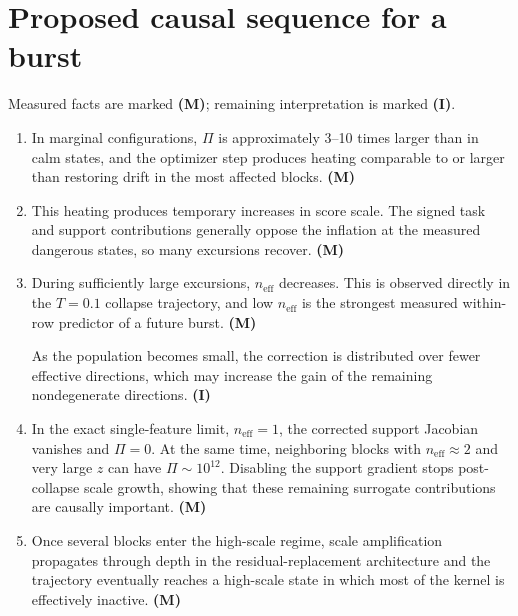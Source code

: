 \documentclass[11pt,a4paper]{article}
\newcommand{\neff}{n_{\mathrm{eff}}}
\newcommand{\Pisurr}{\Pi}
\begin{document}
\section{Proposed causal sequence for a burst}

Measured facts are marked \textbf{(M)}; remaining interpretation is marked \textbf{(I)}.

\begin{enumerate}[leftmargin=1.6em]
\item In marginal configurations, \(\Pisurr\) is approximately 3--10 times larger than in calm states, and the optimizer step produces heating comparable to or larger than restoring drift in the most affected blocks. \textbf{(M)}

\item This heating produces temporary increases in score scale. The signed task and support contributions generally oppose the inflation at the measured dangerous states, so many excursions recover. \textbf{(M)}

\item During sufficiently large excursions, \(\neff\) decreases. This is observed directly in the \(T=0.1\) collapse trajectory, and low \(\neff\) is the strongest measured within-row predictor of a future burst. \textbf{(M)}

As the population becomes small, the correction is distributed over fewer effective directions, which may increase the gain of the remaining nondegenerate directions. \textbf{(I)}

\item In the exact single-feature limit, \(\neff=1\), the corrected support Jacobian vanishes and \(\Pisurr=0\). At the same time, neighboring blocks with \(\neff\approx2\) and very large \(z\) can have \(\Pisurr\sim10^{12}\). Disabling the support gradient stops post-collapse scale growth, showing that these remaining surrogate contributions are causally important. \textbf{(M)}

\item Once several blocks enter the high-scale regime, scale amplification propagates through depth in the residual-replacement architecture and the trajectory eventually reaches a high-scale state in which most of the kernel is effectively inactive. \textbf{(M)}
\end{enumerate}

\end{document}
